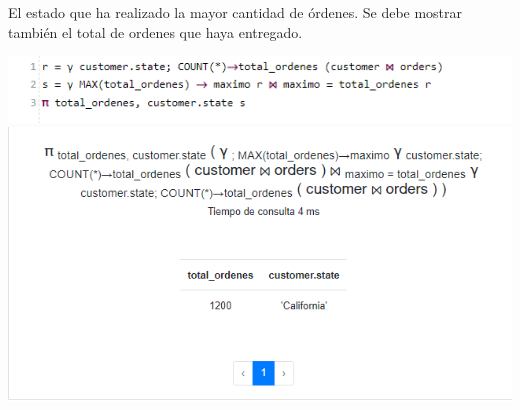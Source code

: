 El estado que ha realizado la mayor cantidad de órdenes. Se debe mostrar también el total de ordenes que haya
entregado.

\includegraphics[width= 15cm]{resources/2i-1.png}
\vspace{0.15cm}
\includegraphics[width= 15cm]{resources/2i-2.png}